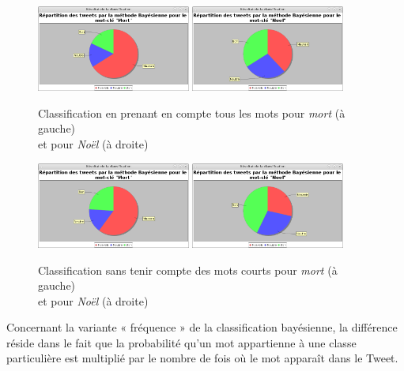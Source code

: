 \documentclass[12pt,a4paper]{report}
\begin{document}
\begin{figure}
	\centering
	\includegraphics[width=0.45\textwidth]{img/classificationMortBayesTouslesMots.png}
	\includegraphics[width=0.45\textwidth]{img/classificationtouslesmotsnoel.png}
	\caption{Classification en prenant en compte tous les mots pour
	\textit{mort} (à gauche)\\et pour \textit{Noël} (à droite)}
	\label{bayes_tous_les_mots}
\end{figure}

\begin{figure}
	\centering
	\includegraphics[width=0.45\textwidth]{img/classificationMortpastouslesMots.png}
	\includegraphics[width=0.45\textwidth]{img/classificationpastouslesmotsnoel.png}
	\caption{Classification sans tenir compte des mots courts pour
	\textit{mort} (à gauche)\\et pour \textit{Noël} (à droite)}
	\label{bayes_pas_tous_les_mots}
\end{figure}

Concernant la variante « fréquence » de la classification bayésienne, la
différence réside dans le fait que la probabilité qu'un mot appartienne à une
classe particulière est multiplié par le nombre de fois où le mot apparaît dans
le Tweet.
\end{document}
